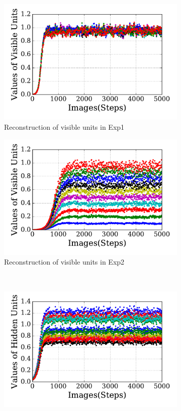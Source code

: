 \begin{figure}
\begin{subfigure}[t]{0.48\textwidth}
		\includegraphics[width=\textwidth]{pics_sdlm/21_exp_AE_noise/exp1_recon_s.pdf}
		\caption{Reconstruction of visible units in Exp1}
	\end{subfigure}
	\begin{subfigure}[t]{0.48\textwidth}
		\includegraphics[width=\textwidth]{pics_sdlm/21_exp_AE_noise/exp2_recon_s.pdf}
		\caption{Reconstruction of visible units in Exp2}
	\end{subfigure}\\
	\begin{subfigure}[t]{0.48\textwidth}
		\includegraphics[width=\textwidth]{pics_sdlm/21_exp_AE_noise/exp1_hid_s.pdf}

\end{subfigure}
\end{figure}
